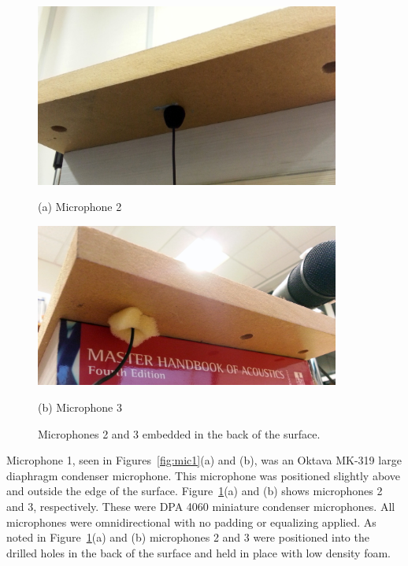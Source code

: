\begin{figure}[t!]
\begin{minipage}[b]{1.0\linewidth}
  \centering
  \centerline{\includegraphics[width=10cm]{mic2}}%
  \centerline{(a) Microphone 2}\medskip
\end{minipage}
\begin{minipage}[b]{1.0\linewidth}
  \centering
  \centerline{\includegraphics[width=10cm]{mic3}}%
  \centerline{(b) Microphone 3}\medskip
\end{minipage}
\caption{Microphones 2 and 3 embedded in the back of the surface.}
\label{fig:mic23}
\end{figure}


Microphone 1, seen in Figures~\ref{fig:mic1}(a) and (b), was an Oktava MK-319 large diaphragm condenser microphone. This microphone was positioned slightly above and outside the edge of the surface. Figure~\ref{fig:mic23}(a) and (b) shows microphones 2 and 3, respectively. These were DPA 4060 miniature condenser microphones. All microphones were omnidirectional with no padding or equalizing applied. As noted in Figure~\ref{fig:mic23}(a) and (b) microphones 2 and 3 were positioned into the drilled holes in the back of the surface and held in place with low density foam.


